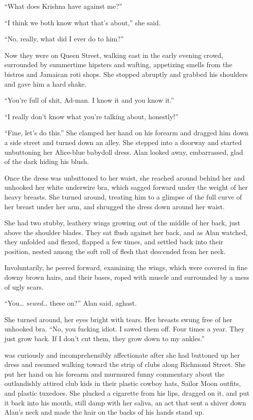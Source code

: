 ``What does Krishna have against me?''

``I think we both know what that's about,'' she said.

``No, really, what did I ever do to him?''

Now they were on Queen Street, walking east in the early evening
crowd, surrounded by summertime hipsters and wafting, appetizing
smells from the bistros and Jamaican roti shops.  She stopped abruptly
and grabbed his shoulders and gave him a hard shake.

``You're full of shit, Ad-man.  I know it and you know it.''

``I really don't know what you're talking about, honestly!''

``Fine, let's do this.'' She clamped her hand on his forearm and
dragged him down a side street and turned down an alley.  She stepped
into a doorway and started unbuttoning her Alice-blue babydoll dress. 
Alan looked away, embarrassed, glad of the dark hiding his blush.

Once the dress was unbuttoned to her waist, she reached around behind
her and unhooked her white underwire bra, which sagged forward under
the weight of her heavy breasts.  She turned around, treating him to a
glimpse of the full curve of her breast under her arm, and shrugged
the dress down around her waist.

She had two stubby, leathery wings growing out of the middle of her
back, just above the shoulder blades.  They sat flush against her
back, and as Alan watched, they unfolded and flexed, flapped a few
times, and settled back into their position, nested among the soft
roll of flesh that descended from her neck.

Involuntarily, he peered forward, examining the wings, which were
covered in fine downy brown hairs, and their bases, roped with muscle
and surrounded by a mess of ugly scars.

``You\ldots{}  \textit{sewed}\ldots{}  these on?'' Alan said, aghast.

She turned around, her eyes bright with tears.  Her breasts swung free
of her unhooked bra.  ``No, you fucking idiot.  I sawed them off. 
Four times a year.  They just grow back.  If I don't cut them, they
grow down to my ankles.''

 was curiously and incomprehensibly affectionate after she had
buttoned up her dress and resumed walking toward the strip of clubs
along Richmond Street.  She put her hand on his forearm and murmured
funny commentary about the outlandishly attired club kids in their
plastic cowboy hats, Sailor Moon outfits, and plastic tuxedoes.  She
plucked a cigarette from his lips, dragged on it, and put it back into
his mouth, still damp with her saliva, an act that sent a shiver down
Alan's neck and made the hair on the backs of his hands stand up.

